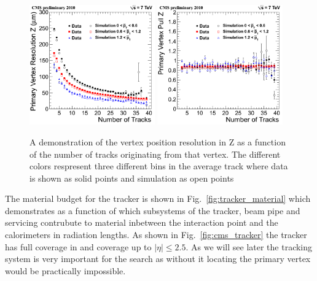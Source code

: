 \begin{figure}
  \includegraphics[width=0.48\textwidth]{ch2_cms_exp/plots/ResZ_byPt.png}
  \includegraphics[width=0.48\textwidth]{ch2_cms_exp/plots/PullZ_byPt.png}
  \caption[Vertex resolution]{A demonstration of the vertex position resolution in Z as a function of the number of tracks originating from that vertex. The different colors respresent three different bins in the average track \pT where data is shown as solid points and simulation as open points~\cite{cms-tracker-performance-2010} }
  \label{fig:tracker_vertex_resolution}
\end{figure}

The material budget for the tracker is shown in Fig.~\ref{fig:tracker_material} which demonstrates as a function of \eta which subsystems of the tracker, beam pipe and servicing contrubute to material inbetween the interaction point and the calorimeters in radiation lengths. As shown in Fig.~\ref{fig:cms_tracker} the tracker has full coverage in \phi and coverage up to $|\eta|\leq2.5$. As we will see later the tracking system is very important for the \Hgg search as without it locating the primary vertex would be practically impossible.

